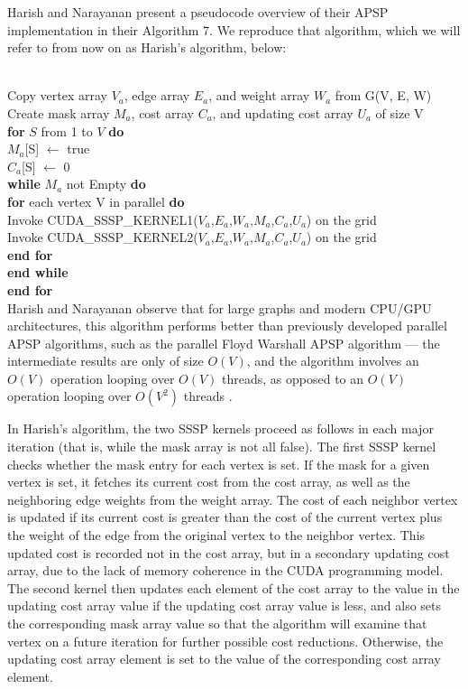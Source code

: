 \documentclass[copyright]{eptcs}
\begin{document}
Harish and Narayanan \cite{Harish2007} present a pseudocode overview
of their APSP implementation in their Algorithm 7.  We reproduce that 
algorithm, which we will refer to from now on as Harish's algorithm, below:

\noindent
\\
Copy vertex array $V_{a}$, edge array $E_{a}$, and weight array $W_{a}$
from G(V, E, W)\\
Create mask array $M_{a}$, cost array $C_{a}$, and updating cost array 
$U_{a}$ of size V\\
\textbf{for} $S$ from 1 to $V$ \textbf{do}\\
\indent$M_{a}$[S] $\gets$ true\\
\indent$C_{a}$[S] $\gets$ 0\\
\indent \textbf{while} $M_{a}$ not Empty \textbf{do}\\
\indent\indent \textbf{for} each vertex V in parallel \textbf{do}\\
\indent\indent\indent Invoke CUDA\_SSSP\_KERNEL1($V_{a}$,$E_{a}$,$W_{a}$,$M_{a}$,$C_{a}$,$U_{a}$) on the grid\\
\indent\indent\indent Invoke CUDA\_SSSP\_KERNEL2($V_{a}$,$E_{a}$,$W_{a}$,$M_{a}$,$C_{a}$,$U_{a}$) on the grid\\
\indent\indent  \textbf{end for}\\
\indent \textbf{end while}\\
\textbf{end for}\\

Harish and Narayanan observe that for large graphs and modern CPU/GPU
architectures, this algorithm performs better than previously 
developed parallel APSP algorithms, such as the parallel Floyd
Warshall APSP algorithm --- the intermediate results are only of size
$O(V)$, and the algorithm involves an $O(V)$ operation looping over 
$O(V)$ threads, as opposed to an $O(V)$ operation looping over 
$O(V^{2})$ threads \cite{Harish2007}.

In Harish's algorithm, the two SSSP kernels proceed as follows in each
major iteration (that is, while the mask array is not all false).  
The first SSSP kernel checks whether the mask entry for each vertex is set.  
If the mask for a given vertex is set, it fetches its current cost from the
cost array, as well as the neighboring edge weights from the weight
array.  The cost of each neighbor vertex is updated if its current
cost is greater than the cost of the current vertex plus the weight 
of the edge from the original vertex to the neighbor vertex.  
This updated cost is recorded not in the cost array, but in a
secondary updating cost array, due to the lack of memory coherence 
in the CUDA programming model.  The second kernel then updates 
each element of the cost array to the value in the updating cost array 
value if the updating cost array value is less, and also sets the 
corresponding mask array value so that the algorithm will examine 
that vertex on a future iteration for further possible cost
reductions.  Otherwise, the updating cost array element is set to 
the value of the corresponding cost array element.
\end{document}
